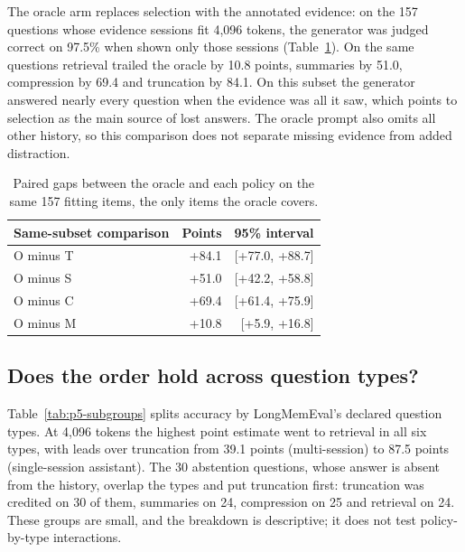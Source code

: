 {The oracle arm replaces selection with the annotated evidence: on the 157 questions whose evidence sessions fit 4,096 tokens, the generator was judged correct on 97.5\% when shown only those sessions (Table~\ref{tab:p5-oracle}). On the same questions retrieval trailed the oracle by 10.8 points, summaries by 51.0, compression by 69.4 and truncation by 84.1. On this subset the generator answered nearly every question when the evidence was all it saw, which points to selection as the main source of lost answers. The oracle prompt also omits all other history, so this comparison does not separate missing evidence from added distraction.

\begin{table}[htbp]\centering\small\setlength{\tabcolsep}{4pt}
\begin{tabular}{lrr}\toprule
Same-subset comparison & Points & 95\% interval\\ \midrule
O minus T & +84.1 & [+77.0, +88.7]\\
O minus S & +51.0 & [+42.2, +58.8]\\
O minus C & +69.4 & [+61.4, +75.9]\\
O minus M & +10.8 & [+5.9, +16.8]\\
\bottomrule\end{tabular}
\caption{Paired gaps between the oracle and each policy on the same 157 fitting items, the only items the oracle covers.}\label{tab:p5-oracle}
\end{table}
\subsection{Does the order hold across question types?}\label{sec:types}
Table~\ref{tab:p5-subgroups} splits accuracy by LongMemEval's declared question types. At 4,096 tokens the highest point estimate went to retrieval in all six types, with leads over truncation from 39.1 points (multi-session) to 87.5 points (single-session assistant). The 30 abstention questions, whose answer is absent from the history, overlap the types and put truncation first: truncation was credited on 30 of them, summaries on 24, compression on 25 and retrieval on 24. These groups are small, and the breakdown is descriptive; it does not test policy-by-type interactions.

}
